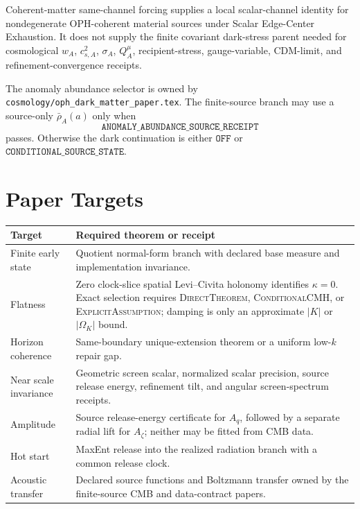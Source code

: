 \documentclass[11pt]{article}
\theoremstyle{remark}
\theoremstyle{plain}
\newcommand{\pathref}[1]{\nolinkurl{#1}}
\begin{document}
Coherent-matter same-channel forcing supplies a local scalar-channel identity for
nondegenerate OPH-coherent material sources under Scalar Edge-Center Exhaustion.
It does not supply the finite covariant dark-stress parent needed for
cosmological \(w_A\), \(c_{s,A}^2\), \(\sigma_A\), \(Q_A^\mu\),
recipient-stress, gauge-variable, CDM-limit, and refinement-convergence
receipts.

The anomaly abundance selector is owned by
\pathref{cosmology/oph_dark_matter_paper.tex}.  The finite-source branch may
use a source-only \(\bar\rho_A(a)\) only when
\[
\texttt{ANOMALY\_ABUNDANCE\_SOURCE\_RECEIPT}
\]
passes.  Otherwise the dark continuation is either \(\texttt{OFF}\) or
\(\texttt{CONDITIONAL\_SOURCE\_STATE}\).

\section{Paper Targets}

\begin{longtable}{@{}p{}p{}@{}}
\toprule
Target & Required theorem or receipt\\
\midrule
\endhead
\bottomrule
\endfoot
Finite early state & Quotient normal-form branch with declared base measure and implementation
invariance.\\
Flatness & Zero clock-slice spatial Levi--Civita holonomy identifies \(\kappa=0\). Exact selection
requires \textsc{DirectTheorem}, \textsc{ConditionalCMH}, or \textsc{ExplicitAssumption}; damping
is only an approximate \(|K|\) or \(|\Omega_K|\) bound.\\
Horizon coherence & Same-boundary unique-extension theorem or a uniform low-\(k\) repair gap.\\
Near scale invariance & Geometric screen scalar, normalized scalar precision, source release
energy, refinement tilt, and angular screen-spectrum receipts.\\
Amplitude & Source release-energy certificate for \(A_q\), followed by a separate radial lift for
\(A_\zeta\); neither may be fitted from CMB data.\\
Hot start & MaxEnt release into the realized radiation branch with a common release clock.\\
Acoustic transfer & Declared source functions and Boltzmann transfer owned by the finite-source CMB
and data-contract papers.\\
\end{longtable}
\end{document}
